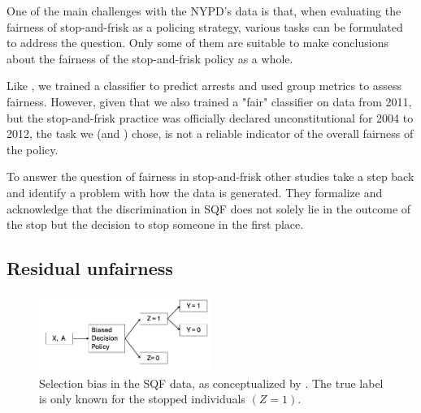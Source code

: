 One of the main challenges with the NYPD's data is that, when evaluating the fairness of stop-and-frisk as a policing strategy, various tasks can be formulated to address the question. Only some of them are suitable to make conclusions about the fairness of the stop-and-frisk policy as a whole.\par
Like \cite{Badr2022DTFANSP}, we trained a classifier to predict arrests and used group metrics to assess fairness. However, given that we also trained a "fair" classifier on data from 2011, but the stop-and-frisk practice was officially declared unconstitutional for 2004 to 2012, the task we (and \cite{Badr2022DTFANSP}) chose, is not a reliable indicator of the overall fairness of the policy.\par
To answer the question of fairness in stop-and-frisk other studies take a step back and identify a problem with how the data is generated. They formalize and acknowledge that the discrimination in SQF does not solely lie in the outcome of the stop but the decision to stop someone in the first place.

\subsection{Residual unfairness}
\begin{figure}[h]
    \includegraphics[width=0.5\textwidth]{../figures/selection_bias.png}
    \caption{Selection bias in the SQF data, as conceptualized by \cite{kallus2018}. The true label is only known for the stopped individuals $(Z = 1)$.}
    \label{fig:selection_bias}
\end{figure}

